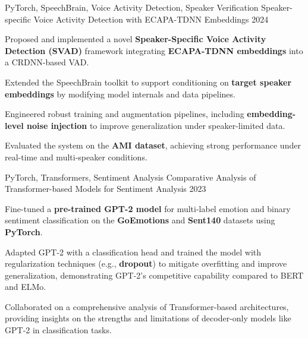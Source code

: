 

\begin{cventries}

\cventry
    {PyTorch, SpeechBrain, Voice Activity Detection, Speaker Verification} %
    {Speaker-specific Voice Activity Detection with ECAPA-TDNN Embeddings} %
    {} %
    {2024} %
    {
      \begin{cvitems}
        \item {Proposed and implemented a novel \textbf{Speaker-Specific Voice Activity Detection (SVAD)} framework integrating \textbf{ECAPA-TDNN embeddings} into a CRDNN-based VAD.}
        \item {Extended the SpeechBrain toolkit to support conditioning on \textbf{target speaker embeddings} by modifying model internals and data pipelines.}
        \item {Engineered robust training and augmentation pipelines, including \textbf{embedding-level noise injection} to improve generalization under speaker-limited data.}
        \item {Evaluated the system on the \textbf{AMI dataset}, achieving strong performance under real-time and multi-speaker conditions.}
      \end{cvitems}
    }
    
\cventry
    {PyTorch, Transformers, Sentiment Analysis} %
    {Comparative Analysis of Transformer-based Models for Sentiment Analysis} %
    {} %
    {2023} %
    {
      \begin{cvitems}
        \item {Fine-tuned a \textbf{pre-trained GPT-2 model} for multi-label emotion and binary sentiment classification on the \textbf{GoEmotions} and \textbf{Sent140} datasets using \textbf{PyTorch}.}
        \item {Adapted GPT-2 with a classification head and trained the model with regularization techniques (e.g., \textbf{dropout}) to mitigate overfitting and improve generalization, demonstrating GPT-2's competitive capability compared to BERT and ELMo.}
        \item {Collaborated on a comprehensive analysis of Transformer-based architectures, providing insights on the strengths and limitations of decoder-only models like GPT-2 in classification tasks.}
      \end{cvitems}
    }


\end{cventries}
